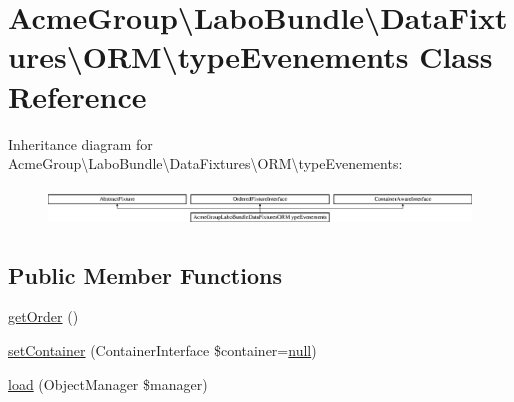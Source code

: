 \hypertarget{class_acme_group_1_1_labo_bundle_1_1_data_fixtures_1_1_o_r_m_1_1type_evenements}{\section{Acme\+Group\textbackslash{}Labo\+Bundle\textbackslash{}Data\+Fixtures\textbackslash{}O\+R\+M\textbackslash{}type\+Evenements Class Reference}
\label{class_acme_group_1_1_labo_bundle_1_1_data_fixtures_1_1_o_r_m_1_1type_evenements}
}
Inheritance diagram for Acme\+Group\textbackslash{}Labo\+Bundle\textbackslash{}Data\+Fixtures\textbackslash{}O\+R\+M\textbackslash{}type\+Evenements\+:\begin{figure}[H]
\begin{center}
\leavevmode
\includegraphics[height=1.031308cm]{class_acme_group_1_1_labo_bundle_1_1_data_fixtures_1_1_o_r_m_1_1type_evenements}
\end{center}
\end{figure}
\subsection*{Public Member Functions}
\begin{DoxyCompactItemize}
\item 
\hyperlink{class_acme_group_1_1_labo_bundle_1_1_data_fixtures_1_1_o_r_m_1_1type_evenements_ac32453b0531bda8ab993c66f2c7917e3}{get\+Order} ()
\item 
\hyperlink{class_acme_group_1_1_labo_bundle_1_1_data_fixtures_1_1_o_r_m_1_1type_evenements_a15b8ba0ec644bf61d15868debee17bec}{set\+Container} (Container\+Interface \$container=\hyperlink{validate_8js_afb8e110345c45e74478894341ab6b28e}{null})
\item 
\hyperlink{class_acme_group_1_1_labo_bundle_1_1_data_fixtures_1_1_o_r_m_1_1type_evenements_a5f3f038977fb1738bbb29096a8b5ca09}{load} (Object\+Manager \$manager)
\end{DoxyCompactItemize}


